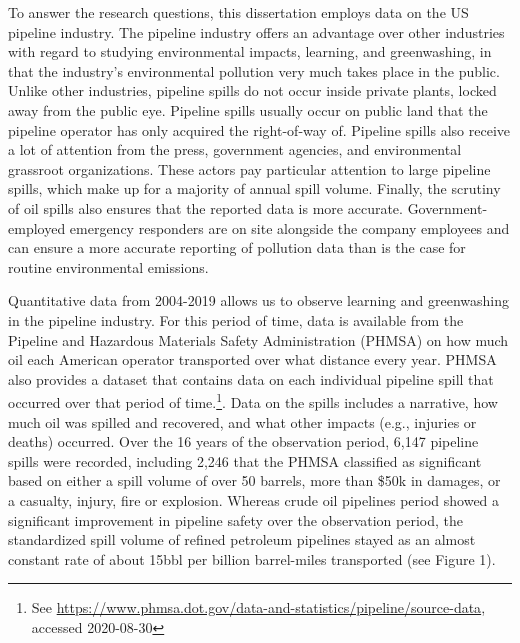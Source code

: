 To answer the research questions, this dissertation employs data on the US pipeline industry. The pipeline industry offers an advantage over other industries with regard to studying environmental impacts, learning, and greenwashing, in that the industry's environmental pollution very much takes place in the public. Unlike other industries, pipeline spills do not occur inside private plants, locked away from the public eye. Pipeline spills usually occur on public land that the pipeline operator has only acquired the right-of-way of. Pipeline spills also receive a lot of attention from the press, government agencies, and environmental grassroot organizations. These actors pay particular attention to large pipeline spills, which make up for a majority of annual spill volume. Finally, the scrutiny of oil spills also ensures that the reported data is more accurate. Government-employed emergency responders are on site alongside the company employees and can ensure a more accurate reporting of pollution data than is the case for routine environmental emissions.

Quantitative data from 2004-2019 allows us to observe learning and greenwashing in the pipeline industry. For this period of time, data is available from the Pipeline and Hazardous Materials Safety Administration (PHMSA) on how much oil each American operator transported over what distance every year. PHMSA also provides a dataset that contains data on each individual pipeline spill that occurred over that period of time.\footnote{See \url{https://www.phmsa.dot.gov/data-and-statistics/pipeline/source-data}, accessed 2020-08-30}. Data on the spills includes a narrative, how much oil was spilled and recovered, and what other impacts (e.g., injuries or deaths) occurred. Over the 16 years of the observation period, 6,147 pipeline spills were recorded, including 2,246 that the PHMSA classified as significant based on either a spill volume of over 50 barrels, more than \$50k in damages, or a casualty, injury, fire or explosion. Whereas crude oil pipelines period showed a significant improvement in pipeline safety over the observation period, the standardized spill volume of refined petroleum pipelines stayed as an almost constant rate of about 15bbl per billion barrel-miles transported (see Figure 1). 

